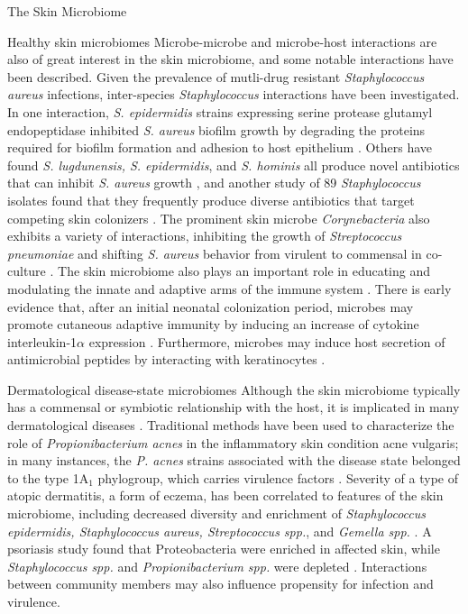 \documentclass[oneside,12pt,final]{sty/ucthesis-CA2012}
\begin{document}
\begin{mainmatter}
\begin{section}{The Skin Microbiome}
\begin{subsection}{Healthy skin microbiomes}
Microbe-microbe and microbe-host interactions are also of great interest in the skin microbiome, and some notable interactions have been described. Given the prevalence of mutli-drug resistant \textit{Staphylococcus aureus} infections, inter-species \textit{Staphylococcus} interactions have been investigated. In one interaction, \textit{S. epidermidis} strains expressing serine protease glutamyl endopeptidase inhibited \textit{S. aureus} biofilm growth by degrading the proteins required for biofilm formation and adhesion to host epithelium \cite{RN113}. Others have found \textit{S. lugdunensis, S. epidermidis}, and \textit{S. hominis} all produce novel antibiotics that can inhibit \textit{S. aureus} growth \cite{RN114, RN115}, and another study of 89 \textit{Staphylococcus} isolates found that they frequently produce diverse antibiotics that target competing skin colonizers \cite{RN118}. The prominent skin microbe \textit{Corynebacteria} also exhibits a variety of interactions, inhibiting the growth of \textit{Streptococcus pneumoniae} and shifting \textit{S. aureus} behavior from virulent to commensal in co-culture \cite{RN117, RN116}. The skin microbiome also plays an important role in educating and modulating the innate and adaptive arms of the immune system \cite{RN119, RN120}. There is early evidence that, after an initial neonatal colonization period, microbes may promote cutaneous adaptive immunity by inducing an increase of cytokine interleukin-1$\alpha$ expression \cite{RN119}. Furthermore, microbes may induce host secretion of antimicrobial peptides by interacting with keratinocytes \cite{RN121}. 

\end{subsection}


\begin{subsection}{Dermatological disease-state microbiomes}
Although the skin microbiome typically has a commensal or symbiotic relationship with the host, it is implicated in many dermatological diseases \cite{RN73}. Traditional methods have been used to characterize the role of \textit{Propionibacterium acnes} in the inflammatory skin condition acne vulgaris; in many instances, the \textit{P. acnes} strains associated with the disease state belonged to the type 1A$_1$ phylogroup, which carries virulence factors \cite{RN109, RN108, RN110}. Severity of a type of atopic dermatitis, a form of eczema, has been correlated to features of the skin microbiome, including decreased diversity and enrichment of \textit{Staphylococcus epidermidis, Staphylococcus aureus, Streptococcus spp.}, and \textit{Gemella spp.} \cite{RN111, RN58}. A psoriasis study found that Proteobacteria were enriched in affected skin, while \textit{Staphylococcus spp.} and \textit{Propionibacterium spp.} were depleted \cite{RN107}. Interactions between community members may also influence propensity for infection and virulence.
\end{subsection}



\end{section}
\end{mainmatter}
\end{document}
